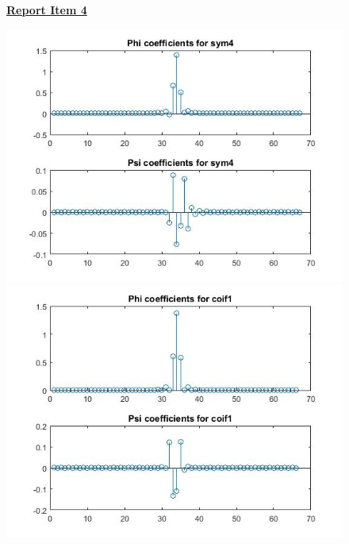 \documentclass{article}
\begin{document}
\begin{figure}[H]
\color{red}
\underline{\textbf{Report Item 4}}
\color{black}

\includegraphics[scale=.5]{3_sym4}
\includegraphics[scale=.5]{3_coif1}
\end{figure}
\end{document}

